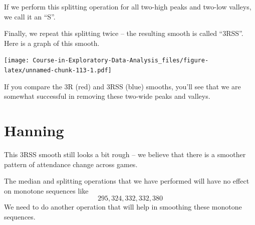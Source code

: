 \documentclass[
]{book}
\newenvironment{Shaded}{\begin{snugshade}}{\end{snugshade}}
\newcommand{\AttributeTok}[1]{\textcolor[rgb]{0.77,0.63,0.00}{#1}}
\newcommand{\FloatTok}[1]{\textcolor[rgb]{0.00,0.00,0.81}{#1}}
\newcommand{\FunctionTok}[1]{\textcolor[rgb]{0.00,0.00,0.00}{#1}}
\newcommand{\NormalTok}[1]{#1}
\newcommand{\OtherTok}[1]{\textcolor[rgb]{0.56,0.35,0.01}{#1}}
\newcommand{\SpecialCharTok}[1]{\textcolor[rgb]{0.00,0.00,0.00}{#1}}
\newcommand{\StringTok}[1]{\textcolor[rgb]{0.31,0.60,0.02}{#1}}
\begin{document}
If we perform this splitting operation for all two-high peaks and two-low valleys, we call it an ``S''.

Finally, we repeat this splitting twice -- the resulting smooth is called ``3RSS''. Here is a graph of this smooth.

\begin{Shaded}
\end{Shaded}

\texttt{[image: Course-in-Exploratory-Data-Analysis\_files/figure-latex/unnamed-chunk-113-1.pdf]}

If you compare the 3R (red) and 3RSS (blue) smooths, you'll see that we are somewhat successful in removing these two-wide peaks and valleys.

\hypertarget{hanning}{%
\section{Hanning}\label{hanning}}

This 3RSS smooth still looks a bit rough -- we believe that there is a smoother pattern of attendance change across games.

The median and splitting operations that we have performed will have no effect on monotone sequences like
\[
295, 324, 332, 332, 380
\]
We need to do another operation that will help in smoothing these monotone sequences.
\end{document}
